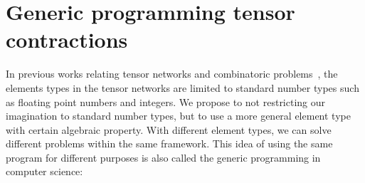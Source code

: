 \documentclass[onefignum, onetabnum]{siamart190516}
\newcommand{\<}{\langle}
\renewcommand{\>}{\rangle}
\newcommand{\blue}[1]{[{\bf  \color{blue}{JG: #1}}]}
\newcommand{\purple}[1]{[{\bf  \color{purple}{MC: #1}}]}
\newcounter{example}
\begin{document}
\section{Generic programming tensor contractions}\label{sec:generic}
In previous works relating tensor networks and combinatoric problems~\cite{Kourtis2019, Biamonte2017}, the elements types in the tensor networks are limited to standard number types such as floating point numbers and integers.
We propose to not restricting our imagination to standard number types, but to use a more general element type with certain algebraic property.
With different element types, we can solve different problems within the same framework.
This idea of using the same program for different purposes is also called the generic programming in computer science:
\end{document}
